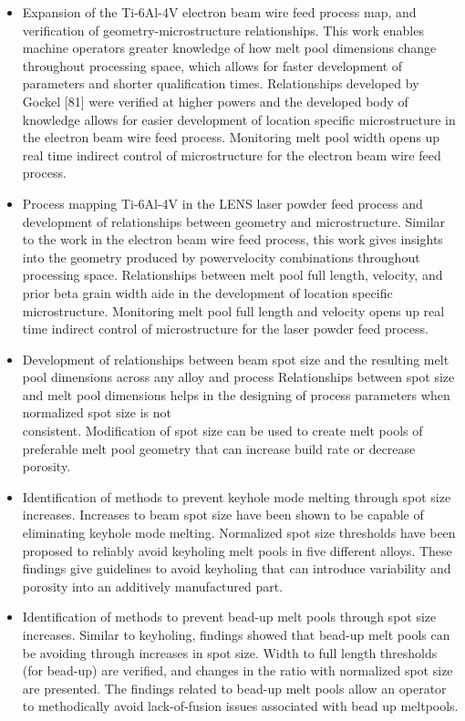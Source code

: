 \documentclass[10pt]{article}
\begin{document}
\begin{itemize}
  \item Expansion of the Ti-6Al-4V electron beam wire feed process map, and verification of geometry-microstructure relationships. This work enables machine operators greater knowledge of how melt pool dimensions change throughout processing space, which allows for faster development of parameters and shorter qualification times. Relationships developed by Gockel [81] were verified at higher powers and the developed body of knowledge allows for easier development of location specific microstructure in the electron beam wire feed process. Monitoring melt pool width opens up real time indirect control of microstructure for the electron beam wire feed process.

  \item Process mapping Ti-6Al-4V in the LENS laser powder feed process and development of relationships between geometry and microstructure. Similar to the work in the electron beam wire feed process, this work gives insights into the geometry produced by powervelocity combinations throughout processing space. Relationships between melt pool full length, velocity, and prior beta grain width aide in the development of location specific microstructure. Monitoring melt pool full length and velocity opens up real time indirect control of microstructure for the laser powder feed process.

  \item Development of relationships between beam spot size and the resulting melt pool dimensions across any alloy and process Relationships between spot size and melt pool dimensions helps in the designing of process parameters when normalized spot size is not\\
consistent. Modification of spot size can be used to create melt pools of preferable melt pool geometry that can increase build rate or decrease porosity.

  \item Identification of methods to prevent keyhole mode melting through spot size increases. Increases to beam spot size have been shown to be capable of eliminating keyhole mode melting. Normalized spot size thresholds have been proposed to reliably avoid keyholing melt pools in five different alloys. These findings give guidelines to avoid keyholing that can introduce variability and porosity into an additively manufactured part.

  \item Identification of methods to prevent bead-up melt pools through spot size increases. Similar to keyholing, findings showed that bead-up melt pools can be avoiding through increases in spot size. Width to full length thresholds (for bead-up) are verified, and changes in the ratio with normalized spot size are presented. The findings related to bead-up melt pools allow an operator to methodically avoid lack-of-fusion issues associated with bead up meltpools.


\end{itemize}
\end{document}
